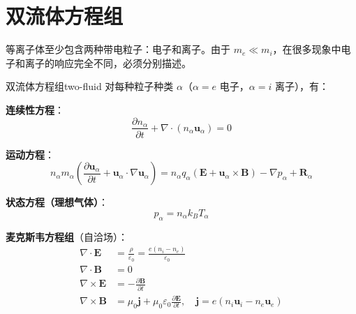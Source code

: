 \documentclass[12pt,a4paper,openany,oneside]{book}
\newcommand{\diffmarktext}[1]{%
  \textcolor{coverMid!80}{\rule[-0.1em]{2pt}{0.9em}}\,%
  \textcolor{coverMid}{\footnotesize\textbf{[#1]}}%
}
\newcommand{\difficulty}[1]{\marginnote{\raggedright\diffmarktext{#1}}}
\newcommand{\eps}{\varepsilon}
\newcommand{\vect}[1]{\bm{#1}}
\newcommand{\grad}{\nabla}
\newcommand{\curl}{\nabla\times}
\newcommand{\divg}{\nabla\cdot}
\begin{document}
\section{双流体方程组}\difficulty{提高}

等离子体至少包含两种带电粒子：电子和离子。由于 $m_e \ll m_i$，在很多现象中电子和离子的响应完全不同，必须分别描述。

\begin{theorem}{双流体方程组}{two-fluid}
对每种粒子种类 $\alpha$（$\alpha = e$ 电子，$\alpha = i$ 离子），有：

\textbf{连续性方程}：
\[
\frac{\partial n_\alpha}{\partial t} + \divg(n_\alpha\vect{u}_\alpha) = 0
\]

\textbf{运动方程}：
\[
n_\alpha m_\alpha\left(\frac{\partial\vect{u}_\alpha}{\partial t} + \vect{u}_\alpha\cdot\grad\vect{u}_\alpha\right) = n_\alpha q_\alpha(\vect{E} + \vect{u}_\alpha\times\vect{B}) - \grad p_\alpha + \vect{R}_\alpha
\]

\textbf{状态方程（理想气体）}：
\[
p_\alpha = n_\alpha k_B T_\alpha
\]

\textbf{麦克斯韦方程组}（自洽场）：
\begin{align*}
\divg\vect{E} &= \frac{\rho}{\eps_0} = \frac{e(n_i - n_e)}{\eps_0} \\
\divg\vect{B} &= 0 \\
\curl\vect{E} &= -\frac{\partial\vect{B}}{\partial t} \\
\curl\vect{B} &= \mu_0\vect{j} + \mu_0\eps_0\frac{\partial\vect{E}}{\partial t}, \quad \vect{j} = e(n_i\vect{u}_i - n_e\vect{u}_e)
\end{align*}
\end{theorem}
\end{document}
